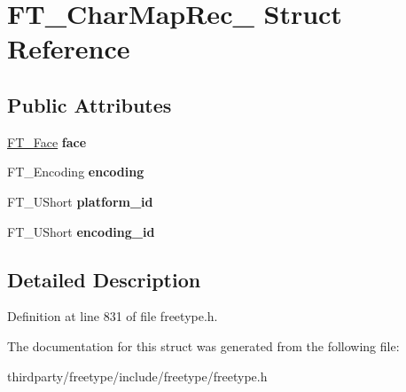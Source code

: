 \hypertarget{struct_f_t___char_map_rec__}{}\section{F\+T\+\_\+\+Char\+Map\+Rec\+\_\+ Struct Reference}
\label{struct_f_t___char_map_rec__}
\subsection*{Public Attributes}
\begin{DoxyCompactItemize}
\item 
\mbox{\label{struct_f_t___char_map_rec___a70a4e53e3f9818209916e5745c46dc28}} 
\hyperlink{struct_f_t___face_rec__}{F\+T\+\_\+\+Face} {\bfseries face}
\item 
\mbox{\label{struct_f_t___char_map_rec___a88ee6f726ef11a8e6cc793d59ff5557e}} 
F\+T\+\_\+\+Encoding {\bfseries encoding}
\item 
\mbox{\label{struct_f_t___char_map_rec___ae7f439996a8615698e780ce3c4f92457}} 
F\+T\+\_\+\+U\+Short {\bfseries platform\+\_\+id}
\item 
\mbox{\label{struct_f_t___char_map_rec___af10dd43eee8dc93e7d6191c663ae831a}} 
F\+T\+\_\+\+U\+Short {\bfseries encoding\+\_\+id}
\end{DoxyCompactItemize}


\subsection{Detailed Description}


Definition at line 831 of file freetype.\+h.



The documentation for this struct was generated from the following file\+:\begin{DoxyCompactItemize}
\item 
thirdparty/freetype/include/freetype/freetype.\+h\end{DoxyCompactItemize}
